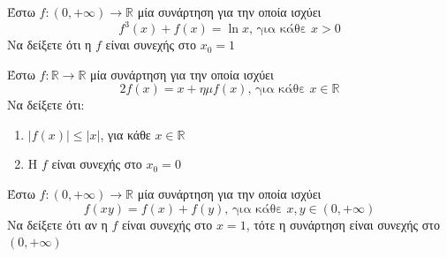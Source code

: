 \documentclass{presentation}
\begin{document}
\begin{askisi}
  Έστω $f:(0,+\infty)\to\mathbb{R}$ μία συνάρτηση για την οποία ισχύει
  $$f^3(x)+f(x)=\ln x \text{, για κάθε } x>0$$
  Να δείξετε ότι η $f$ είναι συνεχής στο $x_0=1$

\end{askisi}

\begin{askisi}
  Έστω $f:\mathbb{R}\to\mathbb{R}$ μία συνάρτηση για την οποία ισχύει
  $$2f(x)=x+ημf(x) \text{, για κάθε } x\in\mathbb{R}$$
  Να δείξετε ότι:
  \begin{enumerate}[<+->]
    \item $|f(x)|\le |x|$, για κάθε $x\in\mathbb{R}$
    \item Η $f$ είναι συνεχής στο $x_0=0$
  \end{enumerate}

\end{askisi}

\begin{askisi}
  Έστω $f:(0,+\infty)\to\mathbb{R}$ μία συνάρτηση για την οποία ισχύει
  $$f(xy)=f(x)+f(y) \text{, για κάθε } x,y\in(0,+\infty)$$
  Να δείξετε ότι αν η $f$ είναι συνεχής στο $x=1$, τότε η συνάρτηση είναι συνεχής στο $(0,+\infty)$

\end{askisi}

\moodle
\end{document}
